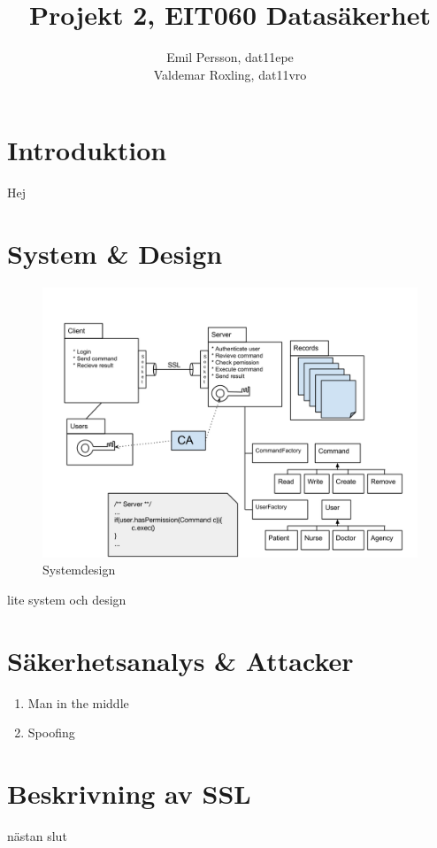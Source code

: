 \documentclass[titlepage,a4paper]{article}
\title{Projekt 2, EIT060 Datasäkerhet}
\author{Emil Persson, dat11epe\\
Valdemar Roxling, dat11vro}
\begin{document}
\maketitle

\tableofcontents

\newpage

\section{Introduktion}
 Hej
\section{System \& Design}

\begin{figure}[!h]
\includegraphics[width=\textwidth]{Design.png}
\caption{Systemdesign}
\label{design}
\end{figure}
 lite system och design
\section{Säkerhetsanalys  \& Attacker}
\begin{enumerate}
\item Man in the middle

\item Spoofing
\end{enumerate}



\section{Beskrivning av SSL}
nästan slut
\end{document}
